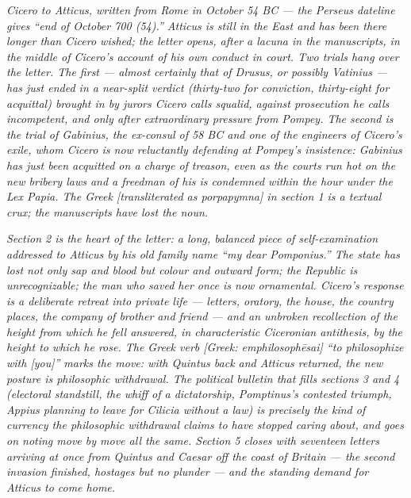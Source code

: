 
\textit{Cicero to Atticus, written from Rome in October 54 BC ---
the Perseus dateline gives ``end of October 700 (54).'' Atticus is
still in the East and has been there longer than Cicero wished; the
letter opens, after a lacuna in the manuscripts, in the middle of
Cicero's account of his own conduct in court. Two trials hang over
the letter. The first --- almost certainly that of Drusus, or possibly
Vatinius --- has just ended in a near-split verdict (thirty-two for
conviction, thirty-eight for acquittal) brought in by jurors Cicero
calls squalid, against prosecution he calls incompetent, and only
after extraordinary pressure from Pompey. The second is the trial of
Gabinius, the ex-consul of 58 BC and one of the engineers of
Cicero's exile, whom Cicero is now reluctantly defending at Pompey's
insistence: Gabinius has just been acquitted on a charge of treason,
even as the courts run hot on the new bribery laws and a freedman of
his is condemned within the hour under the Lex Papia. The Greek
\textit{[transliterated as porpapymna]} in section 1 is a textual
crux; the manuscripts have lost the noun.}

\textit{Section 2 is the heart of the letter: a long, balanced piece
of self-examination addressed to Atticus by his old family name
``my dear Pomponius.'' The state has lost not only sap and blood but
colour and outward form; the Republic is unrecognizable; the man who
saved her once is now ornamental. Cicero's response is a deliberate
retreat into private life --- letters, oratory, the house, the
country places, the company of brother and friend --- and an unbroken
recollection of the height from which he fell answered, in
characteristic Ciceronian antithesis, by the height to which he
rose. The Greek verb \textit{[Greek: emphilosophēsai]} ``to
philosophize with [you]'' marks the move: with Quintus back and
Atticus returned, the new posture is philosophic withdrawal. The
political bulletin that fills sections 3 and 4 (electoral standstill,
the whiff of a dictatorship, Pomptinus's contested triumph, Appius
planning to leave for Cilicia without a law) is precisely the kind
of currency the philosophic withdrawal claims to have stopped
caring about, and goes on noting move by move all the same. Section
5 closes with seventeen letters arriving at once from Quintus and
Caesar off the coast of Britain --- the second invasion finished,
hostages but no plunder --- and the standing demand for Atticus to
come home.}
